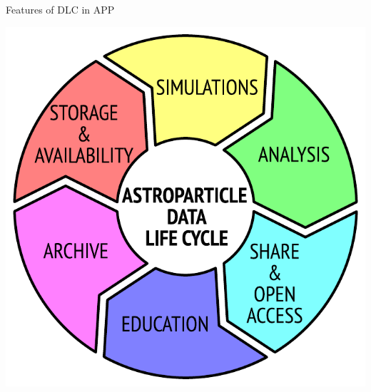 \begin{frame}{Features of DLC in APP}
\begin{minipage}[c]{0.64\textwidth}
\begin{itemize}
        \end{itemize}
    \end{minipage}
    \hfill
    \begin{minipage}[c]{0.35\textwidth}
        \includegraphics[width=1\textwidth]{pics/ADLC.pdf}
    \end{minipage}
\end{frame}
% 
